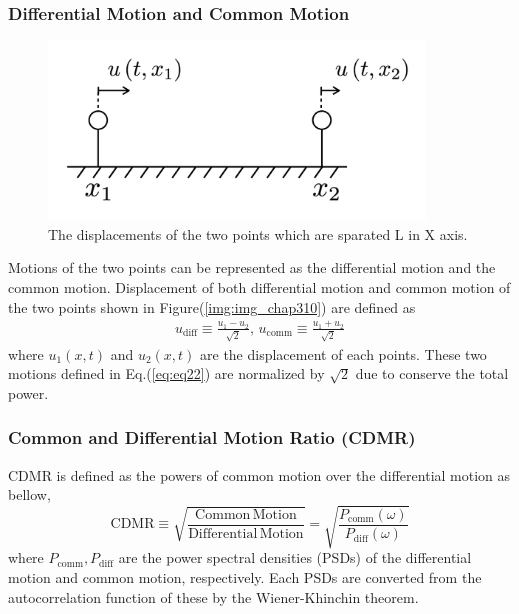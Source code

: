 \subsubsection{Differential Motion and Common Motion}
\begin{figure}[h]
  \begin{center}
    \includegraphics[width=10.0cm]{./img_chap3/img315.png}
    \caption{The displacements of the two points which are sparated L in X axis. }
  \end{center}
\end{figure}

Motions of the two points can be represented as the differential motion and the common motion. Displacement of both differential motion and common motion of the two points shown in Figure(\ref{img:img_chap310}) are defined as
\begin{eqnarray}\label{eq:eq22}
  u_{\mathrm{diff}} \equiv \frac{u_{1}-u_{2}}{\sqrt{2}}, \,
  u_{\mathrm{comm}}  \equiv \frac{u_{1}+u_{2}}{\sqrt{2}}
\end{eqnarray}
where $u_{1}(x,t)$ and $u_2(x,t)$ are the displacement of each points. These two motions defined in Eq.(\ref{eq:eq22}) are normalized by $\sqrt{2}$ due to conserve the total power.


\subsubsection{Common and Differential Motion Ratio (CDMR)}
CDMR is defined as the powers of common motion over the differential motion as bellow,
\begin{equation}
  \mathrm{CDMR} \equiv \sqrt{\frac{\mathrm{Common\,Motion}}{\mathrm{Differential\,Motion}}} = \sqrt{\frac{P_{\mathrm{comm}}(\omega)}{P_{\mathrm{diff}}(\omega)}} \label{eq:eq23}
\end{equation}
where $P_{\mathrm{comm}},P_{\mathrm{diff}}$ are the power spectral densities (PSDs) of the differential motion and common motion, respectively. Each PSDs are converted from the autocorrelation function of these by the Wiener-Khinchin theorem.

